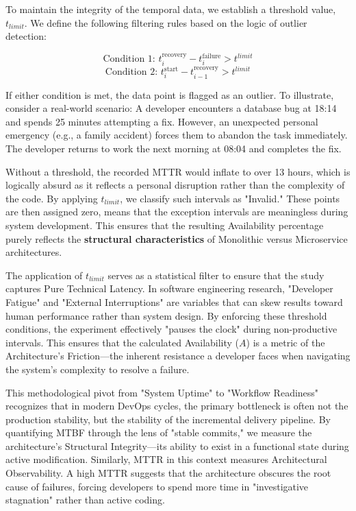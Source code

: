 To maintain the integrity of the temporal data, we establish a threshold 
value, $t_{limit}$. We define the following filtering rules based on the logic of outlier detection:

\begin{equation}
\text{Condition 1: } t^{\text{recovery}}_i - t^{\text{failure}}_i > t^{limit}
\end{equation}
\begin{equation}
\text{Condition 2: } t^{\text{start}}_i - t^{\text{recovery}}_{i-1} > t^{limit}
\end{equation}

If either condition is met, the data point is flagged as an outlier. To illustrate, 
consider a real-world scenario: A developer encounters a database bug at 18:14 and spends 
25 minutes attempting a fix. However, an unexpected personal emergency (e.g., a family accident) 
forces them to abandon the task immediately. The developer returns to work the next morning at 08:04 and completes the fix. 

Without a threshold, the recorded MTTR would inflate to over 13 hours, which is logically absurd 
as it reflects a personal disruption rather than the complexity of the code. By applying $t_{limit}$, 
we classify such intervals as "Invalid." These points are then assigned zero, means that the exception intervals 
are meaningless during system development. This ensures that the resulting Availability percentage 
purely reflects the \textbf{structural characteristics} of Monolithic versus Microservice architectures.

The application of $t_{limit}$ serves as a statistical filter to ensure that the study captures Pure Technical Latency. In software engineering research, "Developer Fatigue" and "External Interruptions" are variables that can skew results toward human performance rather than system design. By enforcing these threshold conditions, the experiment effectively "pauses the clock" during non-productive intervals. This ensures that the calculated Availability ($A$) is a metric of the Architecture’s Friction—the inherent resistance a developer faces when navigating the system’s complexity to resolve a failure.

This methodological pivot from "System Uptime" to "Workflow Readiness" recognizes that in modern DevOps cycles, the primary bottleneck is often not the production stability, but the stability of the incremental delivery pipeline. By quantifying MTBF through the lens of "stable commits," we measure the architecture’s Structural Integrity—its ability to exist in a functional state during active modification. Similarly, MTTR in this context measures Architectural Observability. A high MTTR suggests that the architecture obscures the root cause of failures, forcing developers to spend more time in "investigative stagnation" rather than active coding.

